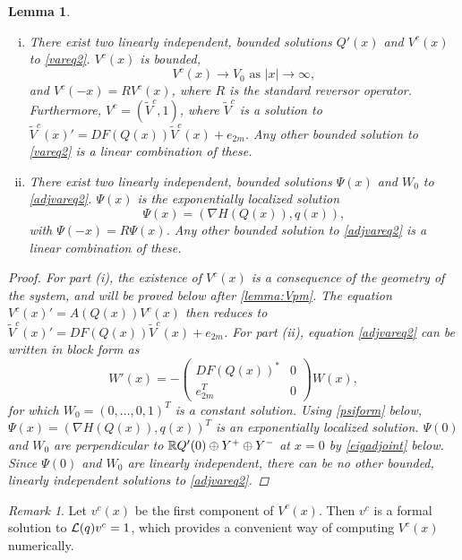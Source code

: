 \documentclass[10pt,reqno]{amsart}
\theoremstyle{plain}
\newtheorem{lemma}[theorem]{Lemma}
\theoremstyle{definition}
\theoremstyle{remark}
\newtheorem{remark}[theorem]{Remark}
\numberwithin{theorem}{section}
\numberwithin{equation}{section}
\begin{document}
\begin{lemma}\label{varadjsolutions}\leavevmode
\begin{enumerate}[(i)]
	\item There exist two linearly independent, bounded solutions $Q'(x)$ and $V^c(x)$ to \eqref{vareq2}. $V^c(x)$ is bounded,
	\begin{equation}
	V^c(x) \rightarrow V_0 \text{ as }|x| \rightarrow \infty,
	\end{equation}
	and	$V^c(-x) = R V^c(x)$, where $R$ is the standard reversor operator. Furthermore, $V^c = (\tilde{V}^c, 1)$, where $\tilde{V}^c$ is a solution to $\tilde{V}^c(x)' = DF(Q(x)) \tilde{V}^c(x) + e_{2m}$. Any other bounded solution to \eqref{vareq2} is a linear combination of these.

	\item There exist two linearly independent, bounded solutions $\Psi(x)$ and $W_0$ to \eqref{adjvareq2}. $\Psi(x)$ is the exponentially localized solution
	\begin{equation}\label{psicomponents}
	\Psi(x) = (\nabla H(Q(x)), q(x)), 
	\end{equation}
	with $\Psi(-x) = R \Psi(x)$. Any other bounded solution to \eqref{adjvareq2} is a linear combination of these.
\end{enumerate}
\begin{proof}
For part (i), the existence of $V^c(x)$ is a consequence of the geometry of the system, and will be proved below after \cref{lemma:Vpm}. The equation $V^c(x)' = A(Q(x))V^c(x)$ then reduces to $\tilde{V}^c(x)' = DF(Q(x)) \tilde{V}^c(x) + e_{2m}$. For part (ii), equation \cref{adjvareq2} can be written in block form as
\[
W'(x) = - 
\begin{pmatrix}DF(Q(x))^* & 0 \\ e_{2m}^T & 0 \end{pmatrix} W(x),
\]
for which $W_0 = (0, \dots, 0, 1)^T$ is a constant solution. Using \cref{psiform} below, $\Psi(x) = ( \nabla H(Q(x)), q(x) )^T$ is an exponentially localized solution. $\Psi(0)$ and $W_0$ are perpendicular to $\mathbb{R} Q'(0) \oplus Y^+ \oplus Y^-$ at $x = 0$ by \cref{eigadjoint} below. Since $\Psi(0)$ and $W_0$ are linearly independent, there can be no other bounded, linearly independent solutions to \eqref{adjvareq2}.
\end{proof}
\end{lemma}

\begin{remark}\label{remark:computeVc}
Let $v^c(x)$ be the first component of $V^c(x)$. Then $v^c$ is a formal solution to $\mathcal{L}(q) v^c = 1$, which provides a convenient way of computing $V^c(x)$ numerically.
\end{remark}
\end{document}
